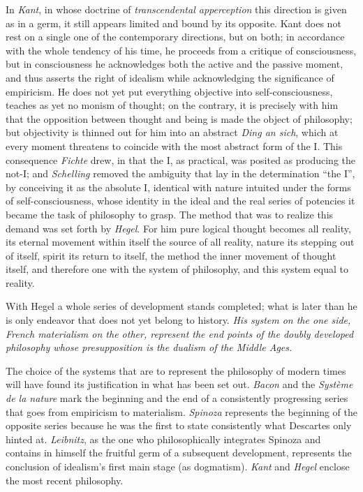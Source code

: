 \documentclass[12pt,a4paper,openany]{book}
\newcommand{\opage}[1]{\marginnote{\footnotesize\textit{[#1]}}}
\begin{document}
In \emph{Kant}, in whose doctrine of \emph{transcendental apperception}
this direction is given as in a germ, it still appears limited and bound
by its opposite. Kant does not rest on a single one of the contemporary
directions, but on both; in accordance with the whole tendency of his
time, he proceeds from a critique of consciousness, but in consciousness
he acknowledges both the active and the passive moment, and thus asserts
the right of idealism while acknowledging the
\opage{11}significance of empiricism. He does not yet put everything
objective into self-consciousness, teaches as yet no monism of thought;
on the contrary, it is precisely with him that the opposition between
thought and being is made the object of philosophy; but objectivity is
thinned out for him into an abstract \emph{Ding an sich}, which at every
moment threatens to coincide with the most abstract form of the I. This
consequence \emph{Fichte} drew, in that the I, as practical, was posited
as producing the not-I; and \emph{Schelling} removed the ambiguity that
lay in the determination ``the I'', by conceiving it as the absolute I,
identical with nature intuited under the forms of self-consciousness,
whose identity in the ideal and the real series of potencies it became
the task of philosophy to grasp. The method that was to realize this
demand was set forth by \emph{Hegel}. For him pure logical thought
becomes all reality, its eternal movement within itself the source of
all reality, nature its stepping out of itself, spirit its return to
itself, the method the inner movement of thought itself, and therefore
one with the system of philosophy, and this system equal to reality.

With Hegel a whole series of development stands completed; what is later
than he is only endeavor that does not yet belong to history. \emph{His
system on the one side, French materialism on the other, represent the
end points of the doubly developed philosophy whose presupposition is
the dualism of the Middle Ages.}

The choice of the systems that are to represent the philosophy of modern
times will have found its justification in what has been set out.
\emph{Bacon} and the \emph{Système de la nature} mark the beginning and
the end of a consistently progressing series that goes from empiricism
to materialism. \emph{Spinoza} represents the beginning of the opposite
series because he was the first to state consistently what Descartes only
hinted at. \emph{Leibnitz}, as the one who philosophically integrates
Spinoza and contains in himself the fruitful germ of a subsequent
development, represents the conclusion of idealism's
\opage{12}first main stage (as dogmatism). \emph{Kant} and \emph{Hegel}
enclose the most recent philosophy.
\end{document}
